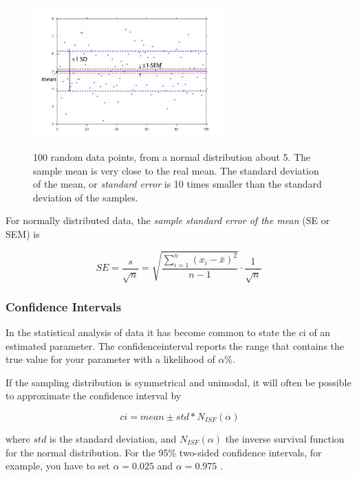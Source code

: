 \begin{figure}[ht]
  \centering
  \includegraphics[width=0.66\textwidth]{../Images/standardError.jpg}\\
  \caption{100 random data points, from a normal distribution about 5. The sample mean is very close to the real mean. The standard deviation of the mean, or \emph{standard error} is 10 times smaller than the standard deviation of the samples.}
  \label{fig:sem}
\end{figure}

For normally distributed data, the \emph{sample standard error of the mean} (SE or SEM) is

\begin{equation}
  SE = \frac{s}{\sqrt{n}} = \sqrt{\frac{{\sum\limits_{i = 1}^n {({x_i-\bar{x}})^2} }}{n-1}} \cdot \frac{1}{\sqrt{n}}
\end{equation}

\subsubsection{Confidence Intervals}

 In the statistical analysis of data it has become common to state the \acrfull{ci} of an estimated parameter. The \gls{confidenceinterval} reports the range that contains the true value for your parameter with a likelihood of $\alpha$\%.

If the sampling distribution is symmetrical and unimodal, it will often be possible to approximate the confidence interval by

\begin{equation}\
  ci = mean \pm std * N_{ISF}(\alpha)
\end{equation}\label{eq:ci}

where $std$ is the  standard deviation, and $N_{ISF}(\alpha)$ the inverse survival function for the normal distribution. For the 95\% two-sided confidence intervals, for example, you have to set $\alpha=0.025$ and $\alpha=0.975$ .


